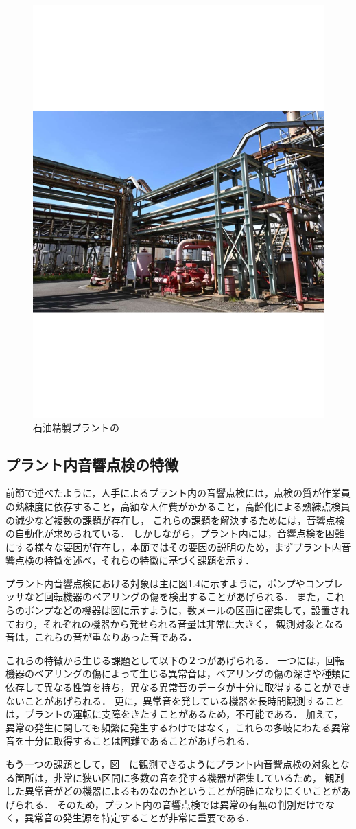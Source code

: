 \documentclass[../main]{subfiles}
\begin{document}
\begin{figure}[t]
  \centering
  \includegraphics[keepaspectratio, width=0.5\linewidth]{chap1/view_plant.pdf}
  \caption{石油精製プラントの}
  \label{fig:view_plant}
\end{figure}
\subsection{プラント内音響点検の特徴}
\label{sec:intro_plant_characteristics}


前節で述べたように，人手によるプラント内の音響点検には，点検の質が作業員の熟練度に依存すること，高額な人件費がかかること，高齢化による熟練点検員の減少など複数の課題が存在し，
これらの課題を解決するためには，音響点検の自動化が求められている．
しかしながら，プラント内には，音響点検を困難にする様々な要因が存在し，本節ではその要因の説明のため，まずプラント内音響点検の特徴を述べ，それらの特徴に基づく課題を示す．

プラント内音響点検における対象は主に図1.4に示すように，ポンプやコンプレッサなど回転機器のベアリングの傷を検出することがあげられる．
また，これらのポンプなどの機器は図に示すように，数メールの区画に密集して，設置されており，それぞれの機器から発せられる音量は非常に大きく，
観測対象となる音は，これらの音が重なりあった音である．

これらの特徴から生じる課題として以下の２つがあげられる．
一つには，回転機器のベアリングの傷によって生じる異常音は，ベアリングの傷の深さや種類に依存して異なる性質を持ち，異なる異常音のデータが十分に取得することができないことがあげられる．
更に，異常音を発している機器を長時間観測することは，プラントの運転に支障をきたすことがあるため，不可能である．
加えて，異常の発生に関しても頻繁に発生するわけではなく，これらの多岐にわたる異常音を十分に取得することは困難であることがあげられる．

もう一つの課題として，図　に観測できるようにプラント内音響点検の対象となる箇所は，非常に狭い区間に多数の音を発する機器が密集しているため，
観測した異常音がどの機器によるものなのかということが明確になりにくいことがあげられる．
そのため，プラント内の音響点検では異常の有無の判別だけでなく，異常音の発生源を特定することが非常に重要である．
\end{document}
